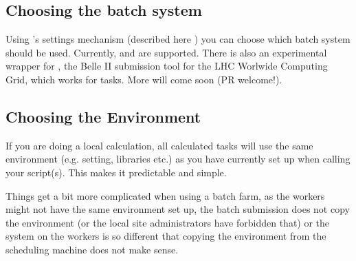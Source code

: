 \documentclass[letterpaper,10pt,english]{sphinxmanual}
\begin{document}
\subsection{Choosing the batch system}
\label{\detokenize{usage/batch:choosing-the-batch-system}}
Using ’s settings mechanism (described here {\hyperref[\detokenize{documentation/api:b2luigi.get_setting}]{}}) you can choose which
batch system should be used.
Currently,  and  are supported.
There is also an experimental wrapper for , the Belle II
submission tool for the LHC Worlwide Computing Grid, which works for  tasks.
More will come soon (PR welcome!).


\subsection{Choosing the Environment}
\label{\detokenize{usage/batch:choosing-the-environment}}
If you are doing a local calculation, all calculated tasks will use the same environment (e.g.  setting, libraries etc.)
as you have currently set up when calling your script(s).
This makes it predictable and simple.

Things get a bit more complicated when using a batch farm, as the workers might not have the same environment set up, the batch
submission does not copy the environment (or the local site administrators have forbidden that) or the system on the workers
is so different that copying the environment from the scheduling machine does not make sense.
\end{document}
